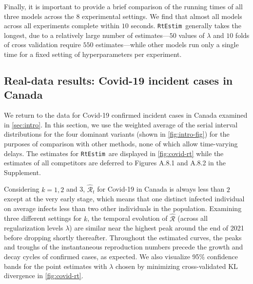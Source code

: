 \documentclass[10pt,letterpaper]{article}
\def\RtEstim{\texttt{RtEstim}}
\def\calR{\mathcal{R}}
\begin{document}
Finally, it is important to provide a brief comparison of the running times of
all three models across the $8$ experimental settings. We find that almost all
models across all experiments complete within $10$ seconds. \RtEstim\ generally
takes the longest, due to a relatively large number of estimates---$50$ values
of $\lambda$ and $10$ folds of cross validation require $550$ estimates---while
other models run only a single time for a fixed setting of hyperparameters per
experiment. 


\subsection{Real-data results: Covid-19 incident cases in Canada}

We return to the data for Covid-19 confirmed incident cases in Canada examined
in \autoref{sec:intro}. In this section, we use the weighted average of the
serial interval distributions for the four dominant variants (shown in
\autoref{fig:intro-fig}) for the purposes of comparison with other methods, none
of which allow time-varying delays. The estimates for \RtEstim\ are displayed in
\autoref{fig:covid-rt} while the estimates of all competitors are deferred to
Figures A.8.1 and A.8.2 in the Supplement. 

Considering $k=1,2$ and 3, $\widehat{\calR}_t$ for Covid-19 in Canada is always
less than $2$ except at the very early stage, which means that one distinct
infected individual on average infects less than two other individuals in the
population. Examining three different settings for $k$, the temporal evolution
of $\widehat{\calR}$ (across all regularization levels $\lambda$) are similar
near the highest peak around the end of 2021 before dropping shortly thereafter.
Throughout the estimated curves, the peaks and troughs of the instantaneous
reproduction numbers precede the growth and decay cycles of confirmed cases, as
expected. We also visualize 95\% confidence bands for the point estimates with
$\lambda$ chosen by minimizing cross-validated KL divergence in
\autoref{fig:covid-rt}.     
\end{document}
